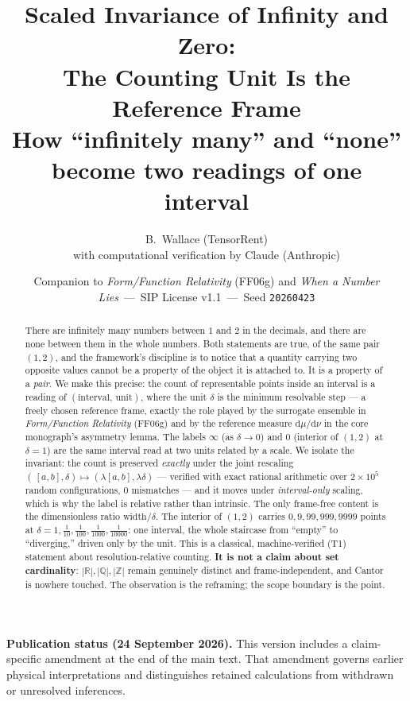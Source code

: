\documentclass[11pt]{article}
\title{\textbf{Scaled Invariance of Infinity and Zero:\\
The Counting Unit Is the Reference Frame}\\[4pt]
\large How ``infinitely many'' and ``none'' become two readings of one interval}
\author{B.\ Wallace \quad (TensorRent)\\
\small with computational verification by Claude (Anthropic)}
\date{\small Companion to \textit{Form/Function Relativity} (FF06g) and \textit{When a Number Lies}\ ---\ SIP License v1.1\ ---\ Seed \texttt{20260423}}
\theoremstyle{definition}
\theoremstyle{plain}
\newcommand{\Z}{\mathbb{Z}}
\newcommand{\R}{\mathbb{R}}
\newcommand{\Q}{\mathbb{Q}}
\begin{document}
\maketitle

\begin{abstract}
There are infinitely many numbers between $1$ and $2$ in the decimals, and there are none
between them in the whole numbers. Both statements are true, of the same pair $(1,2)$, and the
framework's discipline is to notice that a quantity carrying two opposite values cannot be a
property of the object it is attached to. It is a property of a \emph{pair}. We make this precise:
the count of representable points inside an interval is a reading of $(\text{interval},\,\text{unit})$,
where the unit $\delta$ is the minimum resolvable step --- a freely chosen reference frame, exactly
the role played by the surrogate ensemble in \textit{Form/Function Relativity} (FF06g) and by the
reference measure $\mathrm{d}\mu/\mathrm{d}\nu$ in the core monograph's asymmetry lemma. The labels
$\infty$ (as $\delta\to 0$) and $0$ (interior of $(1,2)$ at $\delta=1$) are the same interval read at
two units related by a scale. We isolate the invariant: the count is preserved \emph{exactly} under
the joint rescaling $(\,[a,b],\delta)\mapsto(\lambda[a,b],\lambda\delta)$ --- verified with exact
rational arithmetic over $2\times10^{5}$ random configurations, $0$ mismatches --- and it moves under
\emph{interval-only} scaling, which is why the label is relative rather than intrinsic. The only
frame-free content is the dimensionless ratio $\mathrm{width}/\delta$. The interior of $(1,2)$ carries
$0,9,99,999,9999$ points at $\delta = 1,\tfrac1{10},\tfrac1{100},\tfrac1{1000},\tfrac1{10000}$: one
interval, the whole staircase from ``empty'' to ``diverging,'' driven only by the unit. This is a
classical, machine-verified (T1) statement about resolution-relative counting. \textbf{It is not a
claim about set cardinality}: $|\R|,|\Q|,|\Z|$ remain genuinely distinct and frame-independent, and
Cantor is nowhere touched. The observation is the reframing; the scope boundary is the point.
\end{abstract}
\par\smallskip\noindent\textbf{Publication status (24 September 2026).}
This version includes a claim-specific amendment at the end of the main text.
That amendment governs earlier physical interpretations and distinguishes
retained calculations from withdrawn or unresolved inferences.\par\smallskip
\end{document}
